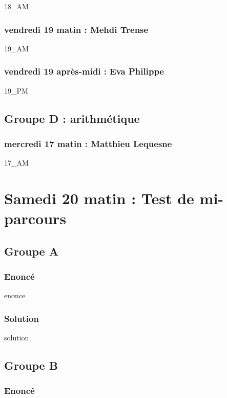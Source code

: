 \documentclass[12pt,A4]{book}
\theoremstyle{definition}
\theoremstyle{thm}
\theoremstyle{def}
\newcounter{sol}[subsection]
\begin{document}
{18_AM}

\subsection{vendredi 19 matin : Mehdi Trense}

{19_AM}

\subsection{vendredi 19 après-midi : Eva Philippe}

{19_PM}


\section {Groupe D : arithmétique}

\subsection{mercredi 17 matin : Matthieu Lequesne}

{17_AM}



\chapter{Samedi 20 matin : Test de mi-parcours}
\minitoc \bigskip


\section{Groupe A}

\subsection{Enoncé}

{enonce}

\subsection{Solution}

{solution}


\section{Groupe B}

\subsection{Enoncé}
\end{document}
